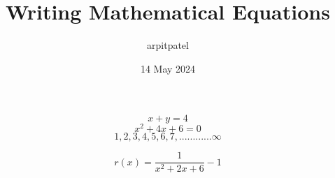 \documentclass{article}
\title{Writing Mathematical Equations}
\author{arpitpatel}
\date{14 May 2024}
\begin{document}
\maketitle

\begin{equation}
    x+y=4 
\end{equation}
\begin{equation}
    x^2+4x+6=0 
\end{equation}
\begin{equation}
    1,2,3,4,5,6,7,............\infty
\end{equation}

\begin{equation}
    r(x)=\frac{1}{x^2+2x+6}-1
\end{equation}
\end{document}
